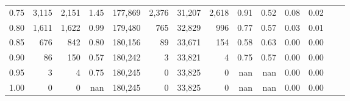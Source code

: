 \begin{tabular}{rrrrrrrrrrrrrr}
0.75 &   3,115 &  2,151 &    1.45 &  177,869 &    2,376 &  31,207 &   2,618 &  0.91 &  0.52 &  0.08 &      0.02 \\
0.80 &   1,611 &  1,622 &    0.99 &  179,480 &      765 &  32,829 &     996 &  0.77 &  0.57 &  0.03 &      0.01 \\
0.85 &     676 &    842 &    0.80 &  180,156 &       89 &  33,671 &     154 &  0.58 &  0.63 &  0.00 &      0.00 \\
0.90 &      86 &    150 &    0.57 &  180,242 &        3 &  33,821 &       4 &  0.75 &  0.57 &  0.00 &      0.00 \\
0.95 &       3 &      4 &    0.75 &  180,245 &        0 &  33,825 &       0 &   nan &   nan &  0.00 &      0.00 \\
1.00 &       0 &      0 &     nan &  180,245 &        0 &  33,825 &       0 &   nan &   nan &  0.00 &      0.00 \\
\bottomrule
\end{tabular}
